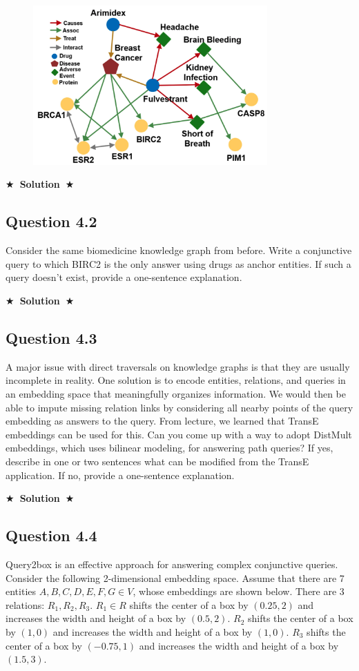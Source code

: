 \documentclass{article}
\newcommand{\Solution}[1]{{\medskip \color{black} \bf $\bigstar$~\sf \textbf{Solution}~$\bigstar$ \sf #1 } \bigskip}
\begin{document}
\begin{figure}[H]
    \centering
    \includegraphics[width=0.8\textwidth]{kg.png}
    \label{fig:5.1}
\end{figure}

\Solution{}

\subsection*{Question 4.2}
Consider the same biomedicine knowledge graph from before. Write a conjunctive query to which BIRC2 is the only answer using drugs as anchor entities. If such a query doesn't exist, provide a one-sentence explanation.

\Solution{}

\subsection*{Question 4.3}
A major issue with direct traversals on knowledge graphs is that they are usually incomplete in reality. One solution is to encode entities, relations, and queries in an embedding space that meaningfully organizes information. We would then be able to impute missing relation links by considering all nearby points of the query embedding as answers to the query. From lecture, we learned that TransE embeddings can be used for this. Can you come up with a way to adopt DistMult embeddings, which uses bilinear modeling, for answering path queries? If yes, describe in one or two sentences what can be modified from the TransE application. If no, provide a one-sentence explanation.

\Solution{}

\subsection*{Question 4.4}
Query2box is an effective approach for answering complex conjunctive queries. Consider the following 2-dimensional embedding space. Assume that there are 7 entities $A, B, C, D, E, F, G \in V$, whose embeddings are shown below. There are 3 relations: $R_1, R_2, R_3$. $R_1 \in R$ shifts the center of a box by $(0.25, 2)$ and increases the width and height of a box by $(0.5, 2)$. $R_2$ shifts the center of a box by $(1, 0)$ and increases the width and height of a box by $(1, 0)$. $R_3$ shifts the center of a box by $(-0.75, 1)$ and increases the width and height of a box by $(1.5, 3)$.
\end{document}
